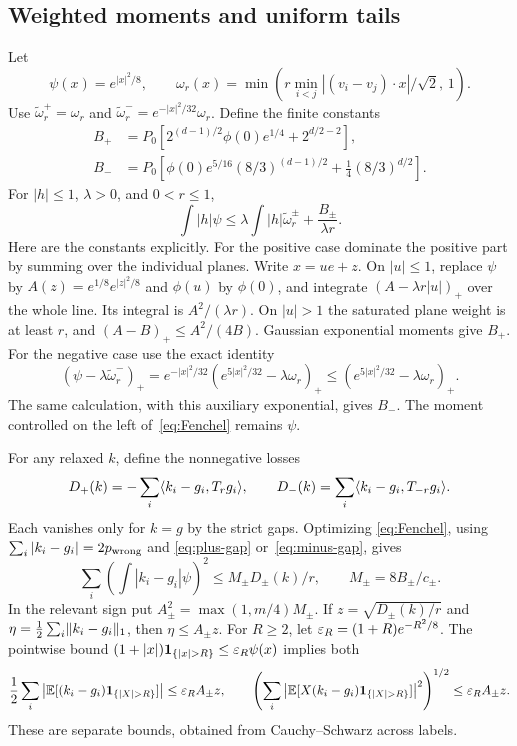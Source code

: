 \subsection{Weighted moments and uniform tails}
Let
\[
 \psi(x)=e^{|x|^2/8},\qquad
 \omega_r(x)=\min\left(r\min_{i<j}|(v_i-v_j)\cdot x|/\sqrt2,\,1\right).
\]
Use $\widetilde\omega_r^+=\omega_r$ and
$\widetilde\omega_r^-=e^{-|x|^2/32}\omega_r$.
Define the finite constants
\begin{align*}
 B_+&=P_0\left[2^{(d-1)/2}\phi(0)e^{1/4}+2^{d/2-2}\right],\\
 B_-&=P_0\left[\phi(0)e^{5/16}(8/3)^{(d-1)/2}
                  +\tfrac14(8/3)^{d/2}\right].
\end{align*}
For $|h|\leq1$, $\lambda>0$, and $0<r\leq1$,
\begin{equation}\label{eq:Fenchel}
 \int|h|\psi\leq\lambda\int|h|\widetilde\omega_r^\pm
                      +\frac{B_\pm}{\lambda r}.
\end{equation}
Here are the constants explicitly. For the positive case dominate the
positive part by summing over the individual planes. Write $x=ue+z$.
On $|u|\leq1$, replace $\psi$ by
$A(z)=e^{1/8}e^{|z|^2/8}$ and $\phi(u)$ by $\phi(0)$, and integrate
$(A-\lambda r|u|)_+$ over the whole line. Its integral is
$A^2/(\lambda r)$. On $|u|>1$ the saturated plane weight is at least $r$,
and $(A-B)_+\leq A^2/(4B)$. Gaussian exponential moments give $B_+$.
For the negative case use the exact identity
\[
 (\psi-\lambda\widetilde\omega_r^-)_+
 =e^{-|x|^2/32}(e^{5|x|^2/32}-\lambda\omega_r)_+
 \leq(e^{5|x|^2/32}-\lambda\omega_r)_+.
\]
The same calculation, with this auxiliary exponential, gives $B_-$.
The moment controlled on the left of~\eqref{eq:Fenchel} remains $\psi$.

For any relaxed $k$, define the nonnegative losses
\[
 D_+(k)=-\sum_i\langle k_i-g_i,T_rg_i\rangle,\qquad
 D_-(k)= \sum_i\langle k_i-g_i,T_{-r}g_i\rangle.
\]
Each vanishes only for $k=g$ by the strict gaps. Optimizing
\eqref{eq:Fenchel}, using $\sum_i|k_i-g_i|=2p_{\rm wrong}$ and
\eqref{eq:plus-gap} or~\eqref{eq:minus-gap}, gives
\begin{equation}\label{eq:weighted-moments}
 \sum_i\left(\int|k_i-g_i|\psi\right)^2\leq M_\pm D_\pm(k)/r,
 \qquad M_\pm=8B_\pm/c_\pm.
\end{equation}
In the relevant sign put $A_\pm^2=\max(1,m/4)M_\pm$.
If $z=\sqrt{D_\pm(k)/r}$ and $\eta=\frac12\sum_i\lVert k_i-g_i\rVert_1$,
then $\eta\leq A_\pm z$.
For $R\geq2$, let $\varepsilon_R=(1+R)e^{-R^2/8}$.
The pointwise bound
$(1+|x|)\1_{\{|x|>R\}}\leq\eps_R\psi(x)$ implies both
\begin{equation}\label{eq:tails}
 \frac12\sum_i\left|\E[(k_i-g_i)\1_{\{|X|>R\}}]\right|
 \leq\eps_RA_\pm z,\qquad
 \left(\sum_i\left|\E[X(k_i-g_i)\1_{\{|X|>R\}}]\right|^2\right)^{1/2}
 \leq\eps_RA_\pm z.
\end{equation}
These are separate bounds, obtained from Cauchy--Schwarz across labels.

